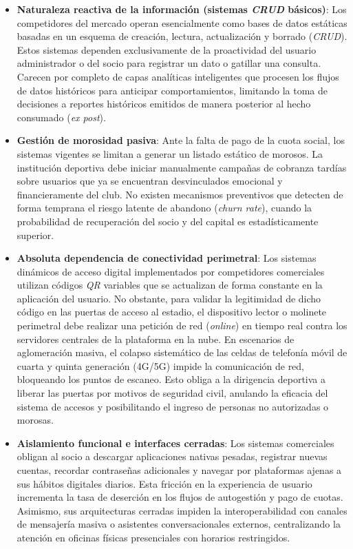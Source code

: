\documentclass[conference, a4paper]{IEEEtran}
\begin{document}
\begin{itemize}
    \item \textbf{Naturaleza reactiva de la informaci\'on (sistemas \textit{CRUD} b\'asicos)}: Los competidores del mercado operan esencialmente como bases de datos est\'aticas basadas en un esquema de creaci\'on, lectura, actualizaci\'on y borrado (\textit{CRUD}). Estos sistemas dependen exclusivamente de la proactividad del usuario administrador o del socio para registrar un dato o gatillar una consulta. Carecen por completo de capas anal\'iticas inteligentes que procesen los flujos de datos hist\'oricos para anticipar comportamientos, limitando la toma de decisiones a reportes hist\'oricos emitidos de manera posterior al hecho consumado (\textit{ex post}).
    \item \textbf{Gesti\'on de morosidad pasiva}: Ante la falta de pago de la cuota social, los sistemas vigentes se limitan a generar un listado est\'atico de morosos. La instituci\'on deportiva debe iniciar manualmente campa\~nas de cobranza tard\'ias sobre usuarios que ya se encuentran desvinculados emocional y financieramente del club. No existen mecanismos preventivos que detecten de forma temprana el riesgo latente de abandono (\textit{churn rate}), cuando la probabilidad de recuperaci\'on del socio y del capital es estad\'isticamente superior.
    \item \textbf{Absoluta dependencia de conectividad perimetral}: Los sistemas din\'amicos de acceso digital implementados por competidores comerciales utilizan c\'odigos \textit{QR} variables que se actualizan de forma constante en la aplicaci\'on del usuario. No obstante, para validar la legitimidad de dicho c\'odigo en las puertas de acceso al estadio, el dispositivo lector o molinete perimetral debe realizar una petici\'on de red (\textit{online}) en tiempo real contra los servidores centrales de la plataforma en la nube. En escenarios de aglomeraci\'on masiva, el colapso sistem\'atico de las celdas de telefon\'ia m\'ovil de cuarta y quinta generaci\'on (4G/5G) impide la comunicaci\'on de red, bloqueando los puntos de escaneo. Esto obliga a la dirigencia deportiva a liberar las puertas por motivos de seguridad civil, anulando la eficacia del sistema de accesos y posibilitando el ingreso de personas no autorizadas o morosas.
    \item \textbf{Aislamiento funcional e interfaces cerradas}: Los sistemas comerciales obligan al socio a descargar aplicaciones nativas pesadas, registrar nuevas cuentas, recordar contrase\~nas adicionales y navegar por plataformas ajenas a sus h\'abitos digitales diarios. Esta fricci\'on en la experiencia de usuario incrementa la tasa de deserci\'on en los flujos de autogesti\'on y pago de cuotas. Asimismo, sus arquitecturas cerradas impiden la interoperabilidad con canales de mensajer\'ia masiva o asistentes conversacionales externos, centralizando la atenci\'on en oficinas f\'isicas presenciales con horarios restringidos.

\end{itemize}
\end{document}
